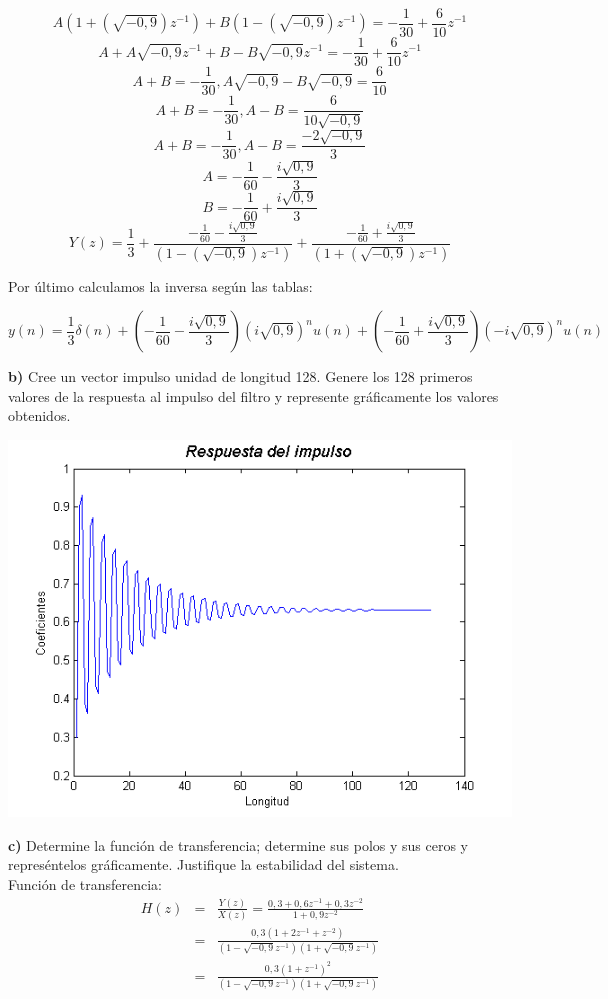 \documentclass[a4paper,12pt]{article}
\begin{document}
$$ A(1 + (\sqrt{-0,9}) z^{-1}) + B(1 - (\sqrt{-0,9}) z^{-1}) = - \frac{1}{30} + \frac{6}{10} z^{-1}$$
$$ A + A \sqrt{-0,9} z^{-1} + B - B\sqrt{-0,9} z^{-1} = - \frac{1}{30} + \frac{6}{10} z^{-1}$$
$$ A + B = - \frac{1}{30}, A\sqrt{-0,9} - B\sqrt{-0,9} = \frac{6}{10} $$
$$ A + B = - \frac{1}{30}, A - B = \frac{6}{10 \sqrt{-0,9}} $$
$$ A + B = - \frac{1}{30}, A - B = \frac{-2 \sqrt{-0,9}}{3} $$
$$ A = -  \frac{1}{60} - \frac{i \sqrt{0,9}}{3} $$
$$ B = -  \frac{1}{60} + \frac{i \sqrt{0,9}}{3} $$
$$ Y(z) = \frac{1}{3} + \frac{-\frac{1}{60} - \frac{i \sqrt{0,9}}{3}}{(1 - (\sqrt{-0,9}) z^{-1})} + \frac{-\frac{1}{60} + \frac{i \sqrt{0,9}}{3}}{(1 + (\sqrt{-0,9}) z^{-1})}$$

Por último calculamos la inversa según las tablas:

$$ y(n) = \frac{1}{3} \delta(n) + (- \frac{1}{60} - \frac{i \sqrt{0,9}}{3})(i \sqrt{0,9})^n u(n) + (- \frac{1}{60} + \frac{i \sqrt{0,9}}{3})(-i \sqrt{0,9})^n u(n)$$

\textbf{b)} Cree un vector impulso unidad de longitud 128. Genere los 128 primeros valores de la respuesta al impulso del filtro y represente gráficamente los valores obtenidos. \\
\begin{center}
\includegraphics[width=.8 \textwidth]{ejercicio1-b.png}
\end{center}

\textbf{c)} Determine la función de transferencia; determine sus polos y sus ceros y represéntelos gráficamente. Justifique la estabilidad del sistema. \\

Función de transferencia:
\begin{eqnarray*}
H(z) & = & \frac{Y(z)}{X(z)} = \frac{0,3 + 0,6 z^{-1} + 0,3 z^{-2}}{1 + 0,9 z^{-2}} \\ & = & \frac{0,3 (1 + 2 z^{-1} + z^{-2})}{(1 - \sqrt{-0,9} z^{-1})(1 + \sqrt{-0,9} z^{-1})} \\ & = & \frac{0,3 (1 + z^{-1})^2}{(1 - \sqrt{-0,9} z^{-1})(1 + \sqrt{-0,9} z^{-1})}
\end{eqnarray*}
\end{document}

